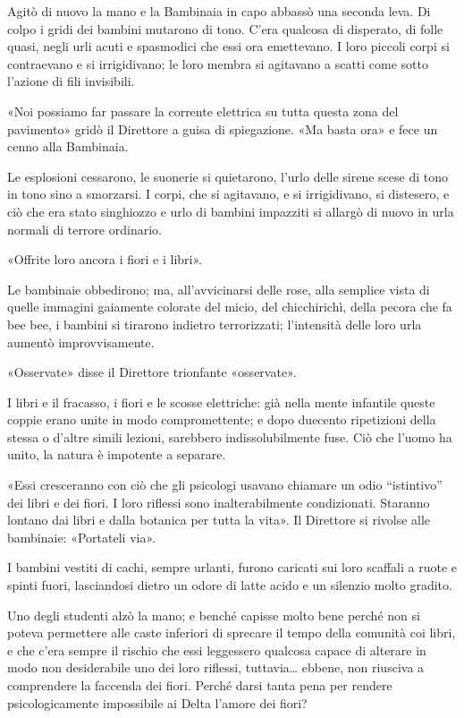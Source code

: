 \documentclass[
a5paper, %
10pt, %
twoside, 
onecolumn, %
openany, %
]{memoir}
\begin{document}
Agitò di nuovo la mano e la Bambinaia in capo abbassò una seconda leva. Di colpo i gridi dei bambini mutarono di tono. C’era qualcosa di disperato, di folle quasi, negli urli acuti e spasmodici che essi ora emettevano. I loro piccoli corpi si contraevano e si irrigidivano; le loro membra si agitavano a scatti come sotto l’azione di fili invisibili.

«Noi possiamo far passare la corrente elettrica su tutta questa zona del pavimento» gridò il Direttore a guisa di spiegazione. «Ma basta ora» e fece un cenno alla Bambinaia.

Le esplosioni cessarono, le suonerie si quietarono, l’urlo delle sirene scese di tono in tono sino a smorzarsi. I corpi, che si agitavano, e si irrigidivano, si distesero, e ciò che era stato singhiozzo e urlo di bambini impazziti si allargò di nuovo in urla normali di terrore ordinario.

«Offrite loro ancora i fiori e i libri».

Le bambinaie obbedirono; ma, all’avvicinarsi delle rose, alla semplice vista di quelle immagini gaiamente colorate del micio, del chicchirichì, della pecora che fa bee bee, i bambini si tirarono indietro terrorizzati; l’intensità delle loro urla aumentò improvvisamente.

«Osservate» disse il Direttore trionfante «osservate».

I libri e il fracasso, i fiori e le scosse elettriche: già nella mente infantile queste coppie erano unite in modo compromettente; e dopo duecento ripetizioni della stessa o d’altre simili lezioni, sarebbero indissolubilmente fuse. Ciò che l’uomo ha unito, la natura è impotente a separare.

«Essi cresceranno con ciò che gli psicologi usavano chiamare un odio “istintivo” dei libri e dei fiori. I loro riflessi sono inalterabilmente condizionati. Staranno lontano dai libri e dalla botanica per tutta la vita». Il Direttore si rivolse alle bambinaie: «Portateli via».

I bambini vestiti di cachi, sempre urlanti, furono caricati sui loro scaffali a ruote e spinti fuori, lasciandosi dietro un odore di latte acido e un silenzio molto gradito.

Uno degli studenti alzò la mano; e benché capisse molto bene perché non si poteva permettere alle caste inferiori di sprecare il tempo della comunità coi libri, e che c’era sempre il rischio che essi leggessero qualcosa capace di alterare in modo non desiderabile uno dei loro riflessi, tuttavia… ebbene, non riusciva a comprendere la faccenda dei fiori. Perché darsi tanta pena per rendere psicologicamente impossibile ai Delta l’amore dei fiori?
\end{document}
